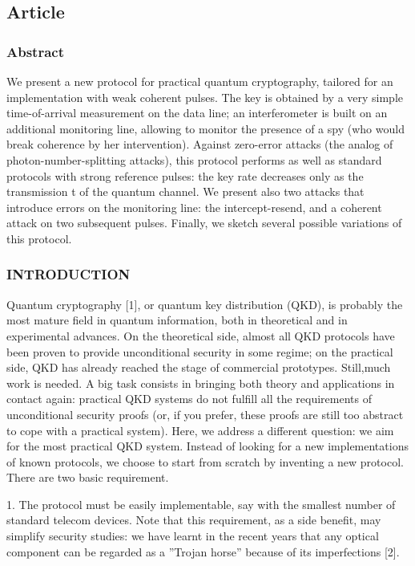 \subsection{Article}

\subsubsection*{Abstract}

We present a new protocol for practical quantum cryptography, tailored for an implementation with weak coherent pulses. The key is obtained by a very simple time-of-arrival measurement on the data line; an interferometer is built on an additional monitoring line, allowing to monitor the presence of a spy (who would break coherence by her intervention). Against zero-error attacks (the analog of photon-number-splitting attacks), this protocol performs as well as standard protocols with strong reference pulses: the key rate decreases only as the transmission t of the quantum channel. We present also two attacks that introduce errors on the monitoring line: the intercept-resend, and a coherent attack on two subsequent pulses. Finally, we sketch several possible variations of this protocol.

\subsubsection{INTRODUCTION}

Quantum cryptography [1], or quantum key distribution (QKD), is probably the most mature field in quantum information, both in theoretical and in experimental advances. On the theoretical side, almost all QKD protocols have been proven to provide unconditional security in some regime; on the practical side, QKD has already reached the stage of commercial prototypes. Still,much work is needed. A big task consists in bringing both theory and applications in contact again: practical QKD systems do not fulfill all the requirements of unconditional security proofs (or, if you prefer, these proofs are still too abstract to cope with a practical system). Here, we address a different question: we aim for the most practical QKD system. Instead of looking for a new implementations of known protocols, we choose to start from scratch by inventing a new protocol. There are two basic requirement.

1. The protocol must be easily implementable, say with the smallest number of standard telecom devices. Note that this requirement, as a side benefit, may simplify security studies: we have learnt in the recent years that any optical component can be regarded as a ”Trojan horse” because of its imperfections [2].


